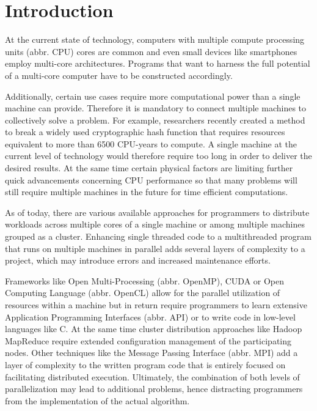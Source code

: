 \chapter{Introduction}
\label{intro}
At the current state of technology, computers with multiple compute processing units (abbr. CPU) cores are common and even small devices like smartphones employ multi-core architectures\cite{arm_big_little}. Programs that want to harness the full potential of a multi-core computer have to be constructed accordingly.

Additionally, certain use cases require more computational power than a single machine can provide. Therefore it is mandatory to connect multiple machines to collectively solve a problem. For example, researchers recently created a method to break a widely used cryptographic hash function that requires resources equivalent to more than 6500 CPU-years to compute\cite{shattered}. A single machine at the current level of technology would therefore require too long in order to deliver the desired results. At the same time certain physical factors are limiting further quick advancements concerning CPU performance\cite{end_of_moores_law}\cite{end_of_silicon} so that many problems will still require multiple machines in the future for time efficient computations.

As of today, there are various available approaches for programmers to distribute workloads across multiple cores of a single machine or among multiple machines grouped as a cluster. Enhancing single threaded code to a multithreaded program that runs on multiple machines in parallel adds several layers of complexity to a project, which may introduce errors and increased maintenance efforts.

Frameworks like Open Multi-Processing (abbr. OpenMP), CUDA or Open Computing Language (abbr. OpenCL) allow for the parallel utilization of resources within a machine but in return require programmers to learn extensive Application Programming Interfaces (abbr. API) or to write code in low-level languages like C.
At the same time cluster distribution approaches like Hadoop MapReduce require extended configuration management of the participating nodes. Other techniques like the Message Passing Interface (abbr. MPI) add a layer of complexity to the written program code that is entirely focused on facilitating distributed execution.
Ultimately, the combination of both levels of parallelization may lead to additional problems, hence distracting programmers from the implementation of the actual algorithm.

